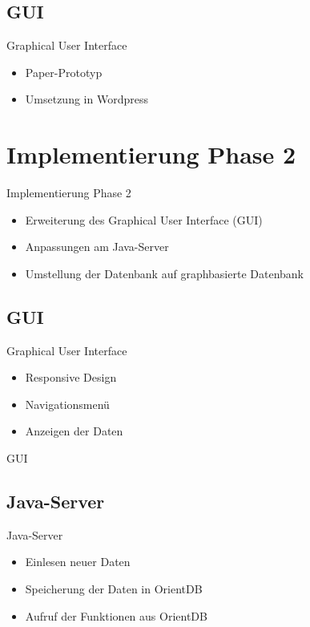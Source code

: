\documentclass[aspectratio=169]{beamer}
\begin{document}
\subsection{GUI}

\begin{frame}{Graphical User Interface}
  \begin{itemize}
    \item Paper-Prototyp
    \item Umsetzung in Wordpress
  \end{itemize}
\end{frame}

\section{Implementierung Phase 2}

\begin{frame}{Implementierung Phase 2}
  \begin{itemize}
  	\item Erweiterung des Graphical User Interface (GUI)
  	\item Anpassungen am Java-Server
  	\item Umstellung der Datenbank auf graphbasierte Datenbank
  \end{itemize}
\end{frame}

\subsection{GUI}

\begin{frame}{Graphical User Interface}
  \begin{itemize}
  	\item Responsive Design
  	\item Navigationsmenü
  	\item Anzeigen der Daten
  \end{itemize}
\end{frame}

\begin{frame}{GUI}
\end{frame}

\subsection{Java-Server}

\begin{frame}{Java-Server}
  \begin{itemize}
  	\item Einlesen neuer Daten
  	\item Speicherung der Daten in OrientDB
  	\item Aufruf der Funktionen aus OrientDB
  \end{itemize}
\end{frame}
\end{document}
